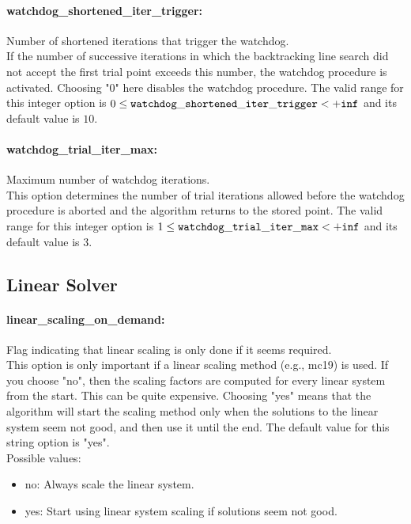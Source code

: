 \paragraph{watchdog\_shortened\_iter\_trigger:}\label{opt:watchdog_shortened_iter_trigger} Number of shortened iterations that trigger the watchdog. \\
 If the number of successive iterations in which the backtracking line search did not accept the first trial point exceeds this number, the watchdog procedure is activated.  Choosing "0" here disables the watchdog procedure. The valid range for this integer option is
$0 \le {\tt watchdog\_shortened\_iter\_trigger } <  {\tt +inf}$
and its default value is $10$.


\paragraph{watchdog\_trial\_iter\_max:}\label{opt:watchdog_trial_iter_max} Maximum number of watchdog iterations. \\
 This option determines the number of trial iterations allowed before the watchdog procedure is aborted and the algorithm returns to the stored point. The valid range for this integer option is
$1 \le {\tt watchdog\_trial\_iter\_max } <  {\tt +inf}$
and its default value is $3$.


\subsection{Linear Solver}
\label{sec:LinearSolver}
\paragraph{linear\_scaling\_on\_demand:}\label{opt:linear_scaling_on_demand} Flag indicating that linear scaling is only done if it seems required. \\
 This option is only important if a linear scaling method (e.g., mc19) is used.  If you choose "no", then the scaling factors are computed for every linear system from the start.  This can be quite expensive. Choosing "yes" means that the algorithm will start the scaling method only when the solutions to the linear system seem not good, and then use it until the end. The default value for this string option is "yes".
\\ 
Possible values:
\begin{itemize}
   \item no: Always scale the linear system.
   \item yes: Start using linear system scaling if solutions seem not good.
\end{itemize}

